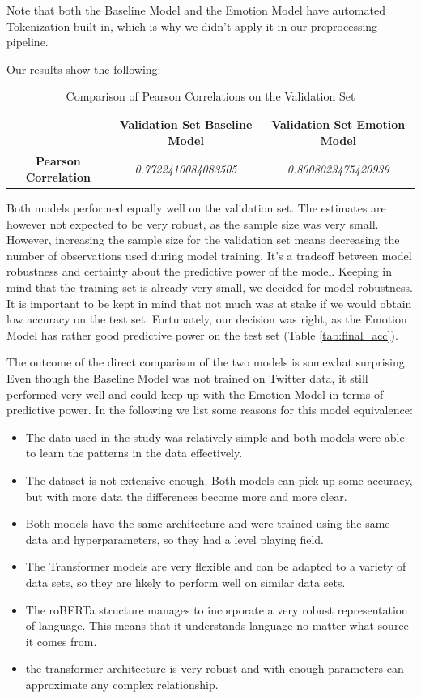 \documentclass{article}
\newcommand\Tstrut{\rule{0pt}{2.6ex}}         %
\newcommand\Bstrut{\rule[-0.9ex]{0pt}{0pt}}   %
\begin{document}
Note that both the Baseline Model and the Emotion Model have automated Tokenization built-in, which is why we didn't apply it in our preprocessing pipeline.

Our results show the following:
\begin{table}[h!]
    \centering
    \begin{tabular}{c|cc}
    \multicolumn{1}{l|}{}  &   \textbf{Validation Set Baseline Model} & \textbf{Validation Set Emotion Model} \Tstrut\Bstrut \\ \hline
    \textbf{Pearson Correlation} & \textit{0.7722410084083505}    & \textit{0.8008023475420939} 
    \end{tabular}
\caption{Comparison of Pearson Correlations on the Validation Set}
\label{tab:r2s}
\end{table}

Both models performed equally well on the validation set. The estimates are however not expected to be very robust, as the sample size was very small. However, increasing the sample size for the validation set means decreasing the number of observations used during model training. It's a tradeoff between model robustness and certainty about the predictive power of the model. Keeping in mind that the training set is already very small, we decided for model robustness. It is important to be kept in mind that not much was at stake if we would obtain low accuracy on the test set. Fortunately, our decision was right, as the Emotion Model has rather good predictive power on the test set (Table \ref{tab:final_acc}).

The outcome of the direct comparison of the two models is somewhat surprising. Even though the Baseline Model was not trained on Twitter data, it still performed very well and could keep up with the Emotion Model in terms of predictive power. 
In the following we list some reasons for this model equivalence:
\begin{itemize}
    \item The data used in the study was relatively simple and both models were able to learn the patterns in the data effectively.
    \item The dataset is not extensive enough. Both models can pick up some accuracy, but with more data the differences become more and more clear.
    \item Both models have the same architecture and were trained using the same data and hyperparameters, so they had a level playing field.
    \item The Transformer models are very flexible and can be adapted to a variety of data sets, so they are likely to perform well on similar data sets.
    \item The roBERTa structure manages to incorporate a very robust representation of language.  This means that it understands language no matter what source it comes from.
    \item the transformer architecture is very robust and with enough parameters can approximate any complex relationship.
    
\end{itemize}
\end{document}
